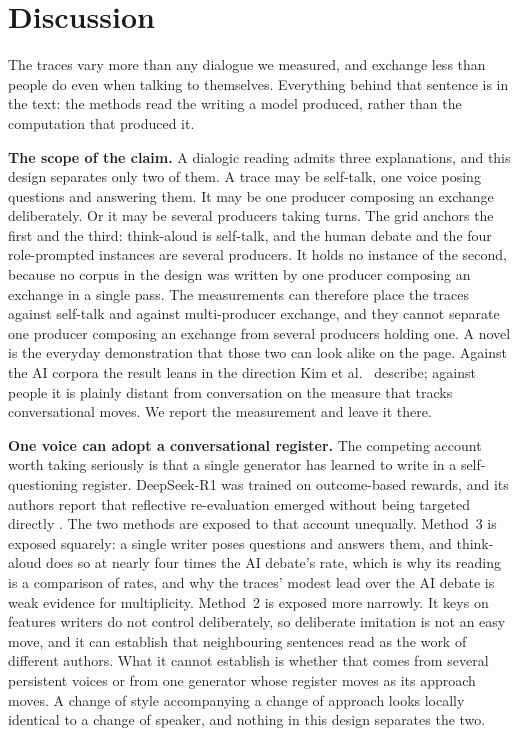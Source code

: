 \documentclass[10pt,twocolumn]{article}
\begin{document}
\section{Discussion}
The traces vary more than any dialogue we measured, and exchange less than people do even when
talking to themselves. Everything behind that sentence is in the text: the methods read the writing a
model produced, rather than the computation that produced it.

\textbf{The scope of the claim.} A dialogic reading admits three explanations, and this design
separates only two of them. A trace may be self-talk, one voice posing questions and answering them.
It may be one producer composing an exchange deliberately. Or it may be several producers taking
turns. The grid anchors the first and the third: think-aloud is self-talk, and the human debate and
the four role-prompted instances are several producers. It holds no instance of the second, because
no corpus in the design was written by one producer composing an exchange in a single pass. The
measurements can therefore place the traces against self-talk and against multi-producer exchange,
and they cannot separate one producer composing an exchange from several producers holding one. A
novel is the everyday demonstration that those two can look alike on the page. Against the AI corpora
the result leans in the direction Kim et al.~\cite{kim2026} describe; against people it is plainly
distant from conversation on the measure that tracks conversational moves. We report the measurement
and leave it there.

\textbf{One voice can adopt a conversational register.} The competing account worth taking seriously
is that a single generator has learned to write in a self-questioning register. DeepSeek-R1 was
trained on outcome-based rewards, and its authors report that reflective re-evaluation emerged
without being targeted directly \cite{guo2025}. The two methods are exposed to that account
unequally. Method~3 is exposed squarely: a single writer poses questions and answers them, and
think-aloud does so at nearly four times the AI debate's rate, which is why its reading is a
comparison of rates, and why the traces' modest lead over the AI debate is weak evidence for
multiplicity. Method~2 is exposed more narrowly. It keys on features writers do not control
deliberately, so deliberate imitation is not an easy move, and it can establish that neighbouring
sentences read as the work of different authors. What it cannot establish is whether that comes from
several persistent voices or from one generator whose register moves as its approach moves. A change
of style accompanying a change of approach looks locally identical to a change of speaker, and
nothing in this design separates the two.
\end{document}
